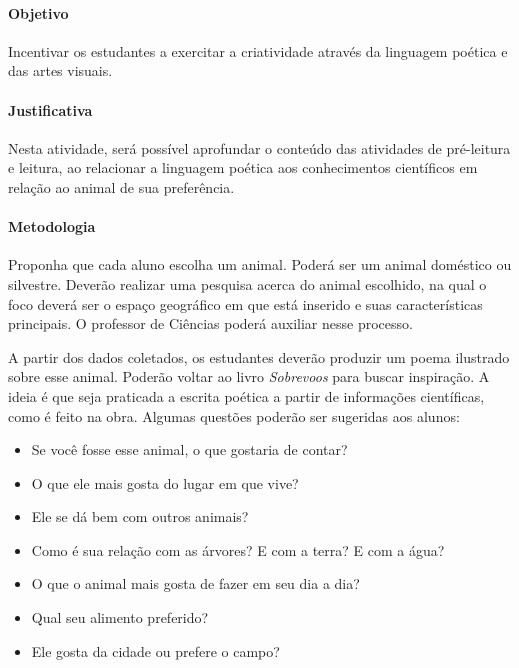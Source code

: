 \documentclass[11pt]{extarticle}
\begin{document}
\paragraph{Objetivo} Incentivar os estudantes a exercitar a criatividade através da linguagem poética e das artes visuais.

\paragraph{Justificativa} Nesta atividade, será possível aprofundar o conteúdo das atividades de pré-leitura e leitura, ao relacionar a linguagem poética aos conhecimentos científicos em relação ao animal de sua preferência. 

\paragraph{Metodologia} Proponha que cada aluno escolha um animal. Poderá ser um animal doméstico ou silvestre. Deverão realizar uma pesquisa acerca do animal escolhido, na qual o foco deverá ser o espaço geográfico em que está inserido e suas características principais. O professor de Ciências poderá auxiliar nesse processo. 


A partir dos dados coletados, os estudantes deverão produzir um poema ilustrado sobre esse animal. Poderão voltar ao livro \textit{Sobrevoos} para buscar inspiração. A ideia é que seja praticada a escrita poética a partir de informações científicas, como é feito na obra. Algumas questões poderão ser sugeridas aos alunos:

\begin{itemize}

\item Se você fosse esse animal, o que gostaria de contar?

\item O que ele mais gosta do lugar em que vive?

\item Ele se dá bem com outros animais?

\item Como é sua relação com as árvores? E com a terra? E com a água?

\item O que o animal mais gosta de fazer em seu dia a dia?

\item Qual seu alimento preferido?

\item Ele gosta da cidade ou prefere o campo?

\end{itemize}
\end{document}
